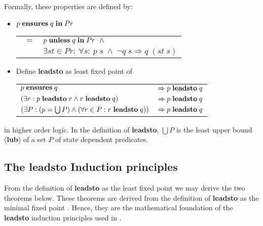 Formally, these properties are defined by:
\begin{itemize}
  \item $p\;{\bf ensures}\;q\;{\bf in}\;Pr$\\
     \begin{tabular}{ll}
       $\ \;=$ & $p\;{\bf unless}\;q\;{\bf in}\;Pr\ \;\wedge$\\
               & $\exists st \in Pr\!:\ \forall s\!:\
                   p\;s\;\wedge\;\neg q\;s \Rightarrow q\;(st\;s)$
     \end{tabular}
  \item Define {\bf leadsto} as least fixed point of\\
      \begin{tabular}{ll}
        \({p\;{\bf ensures}\;q}\) &
           \(\Rightarrow {p\;{\bf leadsto}\;q}\) \\
           \((\exists r: {p\;{\bf leadsto}\;r \wedge r\;{\bf leadsto}\;q})\) &
           \(\Rightarrow {p\;{\bf leadsto}\;q}\) \\
           \((\exists P: (p=\bigcup P) \wedge
             (\forall r\in P: r\;{\bf leadsto}\;q))\) &
           \(\Rightarrow {p\;{\bf leadsto}\;q}\)
       \end{tabular}
\end{itemize}
in higher order logic. In the definition of {\bf leadsto}, $\bigcup P$ is the
least upper bound ({\bf lub}) of a set $P$ of state dependent predicates.

\subsection*{The {\bf leadsto} Induction principles}

From the definition of {\bf leadsto} as the least fixed point we may derive the
two theorems below. These theorems are derived from the definition of 
{\bf leadsto} as the minimal fixed point \cite{FA92}.  Hence, they are the
mathematical foundation of the {\bf leadsto} induction principles used in
\cite{CM88}.

